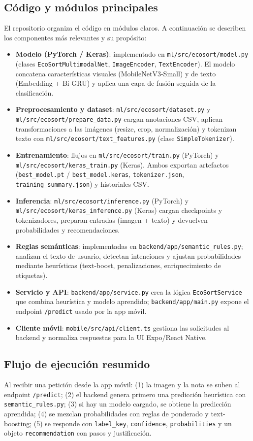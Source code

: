 \documentclass[conference]{IEEEtran}
\begin{document}
\subsection{Código y módulos principales}
El repositorio organiza el código en módulos claros. A continuación se describen los componentes más relevantes y su propósito:
\begin{itemize}
	\item \textbf{Modelo (PyTorch / Keras)}: implementado en \texttt{ml/src/ecosort/model.py} (clases \texttt{EcoSortMultimodalNet}, \texttt{ImageEncoder}, \texttt{TextEncoder}). El modelo concatena características visuales (MobileNetV3-Small) y de texto (Embedding + Bi-GRU) y aplica una capa de fusión seguida de la clasificación.
	\item \textbf{Preprocesamiento y dataset}: \texttt{ml/src/ecosort/dataset.py} y \texttt{ml/src/ecosort/prepare_data.py} cargan anotaciones CSV, aplican transformaciones a las imágenes (resize, crop, normalización) y tokenizan texto con \texttt{ml/src/ecosort/text_features.py} (clase \texttt{SimpleTokenizer}).
	\item \textbf{Entrenamiento}: flujos en \texttt{ml/src/ecosort/train.py} (PyTorch) y \texttt{ml/src/ecosort/keras_train.py} (Keras). Ambos exportan artefactos (\texttt{best\_model.pt} / \texttt{best\_model.keras}, \texttt{tokenizer.json}, \texttt{training\_summary.json}) y historiales CSV.
	\item \textbf{Inferencia}: \texttt{ml/src/ecosort/inference.py} (PyTorch) y \texttt{ml/src/ecosort/keras_inference.py} (Keras) cargan checkpoints y tokenizadores, preparan entradas (imagen + texto) y devuelven probabilidades y recomendaciones.
	\item \textbf{Reglas semánticas}: implementadas en \texttt{backend/app/semantic_rules.py}; analizan el texto de usuario, detectan intenciones y ajustan probabilidades mediante heurísticas (text-boost, penalizaciones, enriquecimiento de etiquetas).
	\item \textbf{Servicio y API}: \texttt{backend/app/service.py} crea la lógica \texttt{EcoSortService} que combina heurística y modelo aprendido; \texttt{backend/app/main.py} expone el endpoint \texttt{/predict} usado por la app móvil.
	\item \textbf{Cliente móvil}: \texttt{mobile/src/api/client.ts} gestiona las solicitudes al backend y normaliza respuestas para la UI Expo/React Native.
\end{itemize}

\subsection{Flujo de ejecución resumido}
Al recibir una petición desde la app móvil: (1) la imagen y la nota se suben al endpoint \texttt{/predict}; (2) el backend genera primero una predicción heurística con \texttt{semantic\_rules.py}; (3) si hay un modelo cargado, se obtiene la predicción aprendida; (4) se mezclan probabilidades con reglas de ponderado y text-boosting; (5) se responde con \texttt{label\_key}, \texttt{confidence}, \texttt{probabilities} y un objeto \texttt{recommendation} con pasos y justificación.
\end{document}
